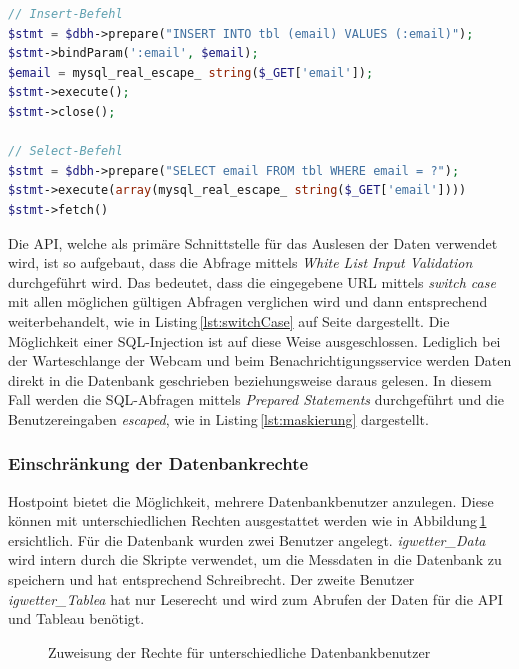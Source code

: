 \vspace{3mm}
\begin{lstlisting}[label=lst:maskierung,caption=Anwendung der Prepared Statements (gekürzt), language=PHP, style=PHP]
// Insert-Befehl
$stmt = $dbh->prepare("INSERT INTO tbl (email) VALUES (:email)");
$stmt->bindParam(':email', $email);
$email = mysql_real_escape_ string($_GET['email']);
$stmt->execute();
$stmt->close();

// Select-Befehl
$stmt = $dbh->prepare("SELECT email FROM tbl WHERE email = ?");
$stmt->execute(array(mysql_real_escape_ string($_GET['email'])))
$stmt->fetch()
\end{lstlisting}
\vspace{3mm}

\noindent
Die API, welche als primäre Schnittstelle für das Auslesen der Daten verwendet wird, ist so aufgebaut, dass die Abfrage mittels \emph{White List Input Validation} durchgeführt wird. Das bedeutet, dass die eingegebene URL mittels \emph{switch case} mit allen möglichen gültigen Abfragen verglichen wird und dann entsprechend weiterbehandelt, wie in Listing\,\ref{lst:switchCase} auf Seite \pageref{lst:switchCase} dargestellt. Die Möglichkeit einer SQL-Injection ist auf diese Weise ausgeschlossen. Lediglich bei der Warteschlange der Webcam und beim Benachrichtigungsservice werden Daten direkt in die Datenbank geschrieben beziehungsweise daraus gelesen. In diesem Fall werden die SQL-Abfragen mittels \emph{Prepared Statements} durchgeführt und die Benutzereingaben \emph{escaped}, wie in Listing\,\ref{lst:maskierung} dargestellt.


\subsubsection{Einschränkung der Datenbankrechte}
Hostpoint bietet die Möglichkeit, mehrere Datenbankbenutzer anzulegen. Diese können mit unterschiedlichen Rechten ausgestattet werden wie in Abbildung\,\ref{img:dbnutzer} ersichtlich.
Für die Datenbank wurden zwei Benutzer angelegt. \emph{igwetter\_Data} wird intern durch die Skripte verwendet, um die Messdaten in die Datenbank zu speichern und hat entsprechend Schreibrecht. Der zweite Benutzer \emph{igwetter\_Tablea} hat nur Leserecht und wird zum Abrufen der Daten für die API und Tableau benötigt.

\begin{figure}[htbp!]
	\centering
	\caption{Zuweisung der Rechte für unterschiedliche Datenbankbenutzer}
	\label{img:dbnutzer}
\end{figure}


